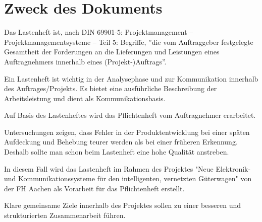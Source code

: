 \section*{Zweck des Dokuments}
Das Lastenheft ist, nach \acrshort{DIN} 69901-5: Projektmanagement – Projektmanagementsysteme – Teil 5: Begriffe, ''die vom Auftraggeber festgelegte Gesamtheit der Forderungen an die Lieferungen und Leistungen eines Auftragnehmers innerhalb eines (Projekt-)Auftrags''\cite{DIN69901-5}.\par
Ein Lastenheft ist wichtig in der Analysephase und zur Kommunikation innerhalb des Auftrages/Projekts. Es bietet eine ausführliche Beschreibung der Arbeitsleistung und dient als Kommunikationsbasis.\par
Auf Basis des Lastenheftes wird das Pflichtenheft vom Auftragnehmer erarbeitet.\par
Untersuchungen zeigen, dass Fehler in der Produktentwicklung bei einer späten Aufdeckung und Behebung teurer werden als bei einer früheren Erkennung. Deshalb sollte man schon beim Lastenheft eine hohe Qualität anstreben.\cite{pmblog}\par
In diesem Fall wird das Lastenheft im Rahmen des Projektes "Neue Elektronik- und Kommunikationssysteme für den intelligenten, vernetzten Güterwagen" von der FH Aachen als Vorarbeit für das Pflichtenheft erstellt. \par
Klare gemeinsame Ziele innerhalb des Projektes sollen zu einer besseren und strukturierten Zusammenarbeit führen.
